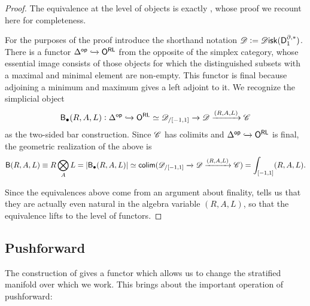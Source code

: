\documentclass[../text]{subfiles}
\begin{document}
\begin{proof}
    The equivalence at the level of objects is exactly \cite[prop.2.34]{aft_fhstrat}, whose proof we recount here for completeness. 

    For the purposes of the proof introduce the shorthand notation $\mathscr{D} := \disk(\mathsf{D}_1^{\partial, *})$. There is a functor $\Delta^{\mathsf{op}} \xhookrightarrow{} \mathsf{O^{RL}}$ from the opposite of the simplex category, whose essential image consists of those objects for which the distinguished subsets with a maximal and minimal element are non-empty. This functor is final because adjoining a minimum and maximum gives a left adjoint to it. We recognize the simplicial object
    \begin{equation}
        \mathsf{B}_{\bullet}(R, A, L): \Delta^{\mathsf{op}} \xhookrightarrow{} \mathsf{O^{RL}} \simeq \mathscr{D}_{/[-1,1]} \xrightarrow{} \mathscr{D} \xrightarrow{(R, A, L)} \mathscr{C}
    \end{equation}
    as the two-sided bar construction. Since $\mathscr{C}$ has colimits and $\Delta^{\mathsf{op}} \xhookrightarrow{} \mathsf{O^{RL}}$ is final, the geometric realization of the above is
    \begin{equation}
        \mathsf{B} (R, A, L) \equiv R \bigotimes\limits_{A} L = |\mathsf{B}_{\bullet}(R, A, L)| \simeq \mathsf{colim} (\mathscr{D}_{/[-1,1]} \xrightarrow{} \mathscr{D} \xrightarrow{(R, A, L)} \mathscr{C}) = \int_{[-1,1]} (R, A, L).
    \end{equation}

    Since the equivalences above come from an argument about finality,  tells us that they are actually even natural in the algebra variable $(R, A, L)$, so that the equivalence lifts to the level of functors.
\end{proof}


\subsection{Pushforward}

The construction of  gives a functor which allows us to change the stratified manifold over which we work. This brings about the important operation of pushforward:
\end{document}
